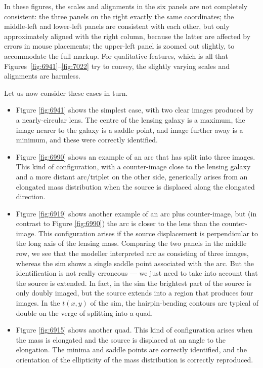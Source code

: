 \FloatBarrier

In these figures, the scales and alignments in the six panels are not
completely consistent: the three panels on the right exactly the same
coordinates; the middle-left and lower-left panels are consistent with
each other, but only approximately aligned with the right column,
because the latter are affected by errors in mouse placements; the
upper-left panel is zoomed out slightly, to accommodate the full
markup.  For qualitative features, which is all that
Figures~\ref{fig:6941}--\ref{fig:7022} try to convey, the slightly
varying scales and alignments are harmless.

Let us now consider these cases in turn.

\begin{itemize}

\item Figure \ref{fig:6941} shows the simplest case, with two clear
  images produced by a nearly-circular lens.  The centre of the
  lensing galaxy is a maximum, the image nearer to the galaxy is a
  saddle point, and image further away is a minimum, and these were
  correctly identified.

\item Figure \ref{fig:6990} shows an example of an arc that has split
  into three images.  This kind of configuration, with a counter-image
  close to the lensing galaxy and a more distant arc/triplet on the
  other side, generically arises from an elongated mass distribution
  when the source is displaced along the elongated direction.

\item Figure \ref{fig:6919} shows another example of an arc plus
  counter-image, but (in contrast to Figure \ref{fig:6990}) the arc is
  closer to the lens than the counter-image. This configuration arises
  if the source displacement is perpendicular to the long axis of the
  lensing mass.  Comparing the two panels in the middle row, we see
  that the modeller interpreted arc as consisting of three images,
  whereas the sim shows a single saddle point associated with the arc.
  But the identification is not really erroneous --- we just need to
  take into account that the source is extended.  In fact, in the sim
  the brightest part of the source is only doubly imaged, but the
  source extends into a region that produces four images.  In the
  $t(x,y)$ of the sim, the hairpin-bending contours are typical of
  double on the verge of splitting into a quad.

\item Figure \ref{fig:6915} shows another quad.  This kind of
  configuration arises when the mass is elongated and the source is
  displaced at an angle to the elongation.  The minima and saddle
  points are correctly identified, and the orientation of the
  ellipticity of the mass distribution is correctly reproduced.


\end{itemize}
